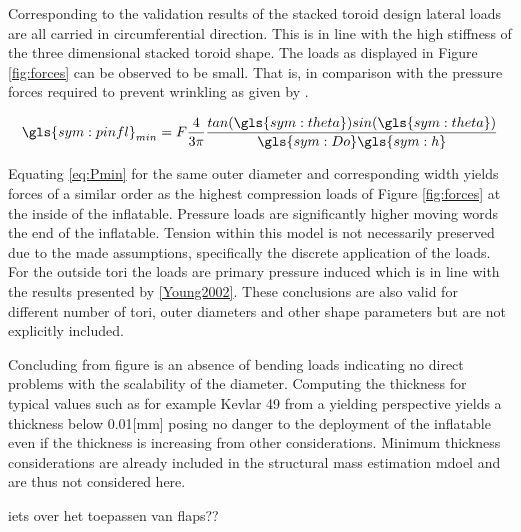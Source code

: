Corresponding to the validation results of the stacked toroid design lateral loads are all carried in circumferential direction. This is in line with the high stiffness of the three dimensional stacked toroid shape. The loads as displayed in Figure \ref{fig:forces} can be observed to be small. That is, in comparison with the pressure forces required to prevent wrinkling as given by \cite{Brown2009}. 

\begin{equation}
\label{eq:Pmin}
\gls{sym:pinfl}_{min} = F \frac{4}{3 \pi} \frac{tan(\gls{sym:theta})sin(\gls{sym:theta}) }{\gls{sym:Do}\gls{sym:h}}
\end{equation}

Equating \ref{eq:Pmin} for the same outer diameter and corresponding width yields forces of a similar order as the highest compression loads of Figure \ref{fig:forces} at the inside of the inflatable. Pressure loads are significantly higher moving words the end of the inflatable. Tension within this model is not necessarily preserved due to the made assumptions, specifically the discrete application of the loads. For the outside tori the loads are primary pressure induced which is in line with the results presented by \ref{Young2002}. These conclusions are also valid for different number of tori, outer diameters and other shape parameters but are not explicitly included. 

Concluding from figure \label{fig:forces} is an absence of bending loads indicating no direct problems with the scalability of the diameter. Computing the thickness for typical values such as for example Kevlar 49 from a yielding perspective yields a thickness below 0.01[mm] posing no danger to the deployment of the inflatable even if the thickness is increasing from other considerations. Minimum thickness considerations are already included in the structural mass estimation mdoel and are thus not considered here.


iets over het toepassen van flaps??


